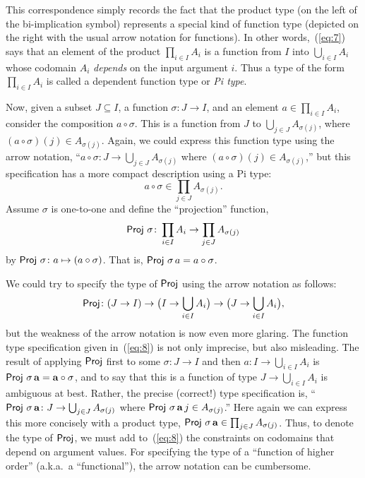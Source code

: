 \documentclass[12pt]{amsart}  %
\begin{document}
This correspondence simply records the fact that the product type 
(on the left of the bi-implication symbol) represents a special 
kind of function type (depicted on the right with the usual 
arrow notation for functions). In other words,~(\ref{eq:7}) says that
an element of the product $\prod_{i\in I} A_i$
is a function from $I$ into $\bigcup_{i\in I} A_i$ 
whose codomain $A_i$ \emph{depends} on the input argument $i$.  
Thus a type of the form $\prod_{i\in I} A_i$ is called a dependent function type or \emph{Pi type}.

Now, given a subset $J \subseteq I$, a function
$\sigma\colon J \rightarrow I$, and an element $a \in \prod_{i\in I}A_i$,
consider the composition $a \circ \sigma$.  This is a function from $J$ 
to $\bigcup_{j\in J} A_{\sigma(j)}$, where $(a\circ \sigma)(j) \in A_{\sigma(j)}$.
Again, we could express this function type using the arrow notation,
``$a \circ \sigma\colon J \rightarrow \bigcup_{j\in J} A_{\sigma(j)}$ 
where $(a\circ \sigma)(j) \in A_{\sigma(j)}$,'' but this 
specification has a more compact description using a Pi type:
\[
a \circ \sigma \in \prod_{j\in J} A_{\sigma(j)}.
\]
Assume $\sigma$ is one-to-one and define the ``projection'' function,
\[
\operatorname{\mathsf{Proj}} \, \sigma  \colon \prod_{i\in I} A_{i} \rightarrow \prod_{j\in J} A_{\sigma(j)}
\]
by 
$\operatorname{\mathsf{Proj}} \, \sigma \colon a \mapsto (a \circ \sigma)$.  That is,
$\operatorname{\mathsf{Proj}} \, \sigma \, a = a \circ \sigma$. 

We could try to specify the type of $\operatorname{\mathsf{Proj}}$ using the arrow notation 
as follows:
\begin{equation}
  \label{eq:8}
  \operatorname{\mathsf{Proj}} \colon (J \rightarrow I)\rightarrow 
  \bigl(I \rightarrow \bigcup_{i\in I} A_{i}\bigr) \rightarrow 
  \bigl(J \rightarrow \bigcup_{i\in I} A_{i}\bigr),
\end{equation}
but the weakness of the arrow notation is now even more glaring.
The function type specification given in~(\ref{eq:8}) 
is not only imprecise, but also misleading. The result of
applying $\operatorname{\mathsf{Proj}}$ first to some $\sigma \colon J \rightarrow I$ and  then
$a\colon I \rightarrow \bigcup_{i\in I} A_{i}$ is 
$\operatorname{\mathsf{Proj}} \, \sigma \, \mathbf{a}= \mathbf{a} \circ \sigma$, and to say that this is 
a function of type $J \rightarrow \bigcup_{i\in I} A_{i}$ 
is ambiguous at best. Rather, the precise (correct!) type
specification is,
``$\operatorname{\mathsf{Proj}} \, \sigma \, \mathbf{a} \colon J \rightarrow \bigcup_{j\in J} A_{\sigma(j)}$ where 
$\operatorname{\mathsf{Proj}}\, \sigma \, \mathbf{a} \, j \in A_{\sigma(j)}$.'' Here again we can express this 
more concisely with a product type,
$\operatorname{\mathsf{Proj}} \, \sigma \, \mathbf{a} \in \prod_{j\in J} A_{\sigma(j)}$.
Thus, to denote the type of $\operatorname{\mathsf{Proj}}$, we must add to~(\ref{eq:8}) 
the constraints on codomains that depend on argument values. 
For specifying the type of a ``function of higher order'' 
(a.k.a.~a ``functional''), the arrow notation can be cumbersome. 
\end{document}
